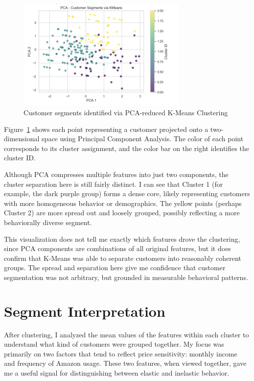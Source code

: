 \documentclass[12pt]{article}
\begin{document}
\begin{figure}[h!]
  \centering
  \includegraphics[width=0.75\textwidth]{pca customer segments via kmeans.png}
  \caption{Customer segments identified via PCA-reduced K-Means Clustering}
  \label{fig:pca-clusters}
\end{figure}

Figure~\ref{fig:pca-clusters} shows each point representing a customer projected onto a two-dimensional space using Principal Component Analysis. The color of each point corresponds to its cluster assignment, and the color bar on the right identifies the cluster ID.

Although PCA compresses multiple features into just two components, the cluster separation here is still fairly distinct. I can see that Cluster 1 (for example, the dark purple group) forms a dense core, likely representing customers with more homogeneous behavior or demographics. The yellow points (perhaps Cluster 2) are more spread out and loosely grouped, possibly reflecting a more behaviorally diverse segment.

This visualization does not tell me exactly which features drove the clustering, since PCA components are combinations of all original features, but it does confirm that K-Means was able to separate customers into reasonably coherent groups. The spread and separation here give me confidence that customer segmentation was not arbitrary, but grounded in measurable behavioral patterns.


\section{Segment Interpretation}

After clustering, I analyzed the mean values of the features within each cluster to understand what kind of customers were grouped together. My focus was primarily on two factors that tend to reflect price sensitivity: monthly income and frequency of Amazon usage. These two features, when viewed together, gave me a useful signal for distinguishing between elastic and inelastic behavior.
\end{document}

